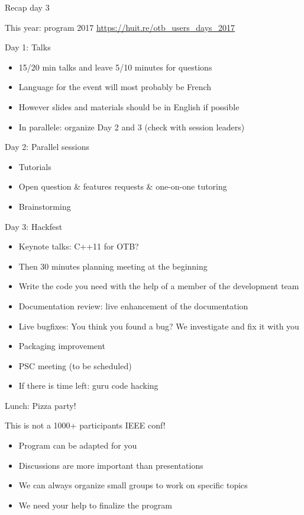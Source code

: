 \documentclass[smaller]{beamer}
\begin{document}
\begin{frame}[label={sec:orgheadline4}]{Recap day 3}
\end{frame}

\begin{frame}[label={sec:orgheadline5}]{This year: program 2017}
\url{https://huit.re/otb_users_days_2017}
\end{frame}
\begin{frame}[label={sec:orgheadline6}]{Day 1: Talks}
\begin{itemize}
\item 15/20 min talks and leave 5/10 minutes for questions
\item Language for the event will most probably be French
\item However slides and materials should be in English if possible
\item In parallele: organize Day 2 and 3 (check with session leaders)
\end{itemize}
\end{frame}
\begin{frame}[label={sec:orgheadline7}]{Day 2: Parallel sessions}
\begin{itemize}
\item Tutorials
\item Open question \& features requests \& one-on-one tutoring
\item Brainstorming
\end{itemize}
\end{frame}
\begin{frame}[label={sec:orgheadline8}]{Day 3: Hackfest}
\begin{itemize}
\item Keynote talks: C++11 for OTB?
\item Then 30 minutes planning meeting at the beginning
\item Write the code you need with the help of a member of the
development team
\item Documentation review: live enhancement of the documentation
\item Live bugfixes: You think you found a bug? We investigate and fix it with you
\item Packaging improvement
\item PSC meeting (to be scheduled)
\item If there is time left: guru code hacking
\end{itemize}

\alert{Lunch: Pizza party!}

\begin{block}{This is not a 1000+ participants IEEE conf!}
\begin{itemize}
\item Program can be adapted for you
\item Discussions are more important than presentations
\item We can always organize small groups to work on specific topics
\item We need your help to finalize the program
\end{itemize}
\end{block}
\end{frame}
\end{document}

